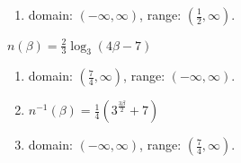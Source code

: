 \begin{exercises}
\begin{problem}
\begin{multicols}{4}
\begin{subproblem}
\begin{shortsolution}
\begin{enumerate}
				\item domain: $(-\infty,\infty)$, range: $\left( \frac{1}{2},\infty \right)$.
			\end{enumerate}
		\end{shortsolution}
	\end{subproblem}
	\begin{subproblem}
		$n(\beta)=\frac{2}{3}\log_3(4\beta-7)$ 
		\begin{shortsolution}
			\begin{enumerate}
				\item domain: $\left( \frac{7}{4},\infty \right)$, range: $(-\infty,\infty)$.
				\item $n^{-1}(\beta)=\frac{1}{4}\left( 3^{\frac{3\beta}{2}}+7\right)$ 
				\item domain: $(-\infty,\infty)$, range: $\left( \frac{7}{4},\infty \right)$.
			\end{enumerate}
		\end{shortsolution}
	\end{subproblem}
\end{multicols}
\end{problem}


\end{exercises}
